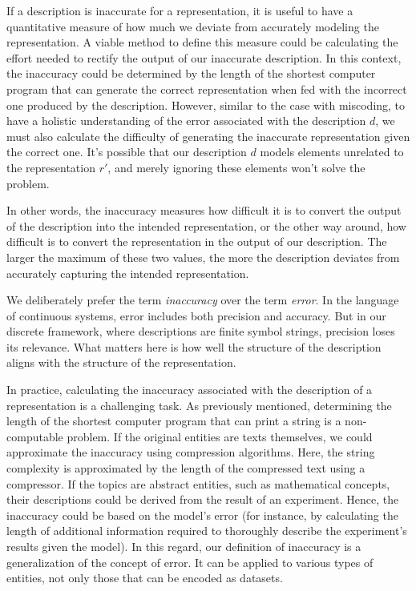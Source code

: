 If a description is inaccurate for a representation, it is useful to have a quantitative measure of how much we deviate from accurately modeling the representation. A viable method to define this measure could be calculating the effort needed to rectify the output of our inaccurate description. In this context, the inaccuracy could be determined by the length of the shortest computer program that can generate the correct representation when fed with the incorrect one produced by the description. However, similar to the case with miscoding, to have a holistic understanding of the error associated with the description $d$, we must also calculate the difficulty of generating the inaccurate representation given the correct one. It's possible that our description $d$ models elements unrelated to the representation $r'$, and merely ignoring these elements won't solve the problem.

In other words, the inaccuracy measures how difficult it is to convert the output of the description into the intended representation, or the other way around, how difficult is to convert the representation in the output of our description. The larger the maximum of these two values, the more the description deviates from accurately capturing the intended representation.

We deliberately prefer the term \emph{inaccuracy} over the term \emph{error}. In the language of continuous systems, error includes both precision and accuracy. But in our discrete framework, where descriptions are finite symbol strings, precision loses its relevance. What matters here is how well the structure of the description aligns with the structure of the representation.

In practice, calculating the inaccuracy associated with the description of a representation is a challenging task. As previously mentioned, determining the length of the shortest computer program that can print a string is a non-computable problem. If the original entities are texts themselves, we could approximate the inaccuracy using compression algorithms. Here, the string complexity is approximated by the length of the compressed text using a compressor. If the topics are abstract entities, such as mathematical concepts, their descriptions could be derived from the result of an experiment. Hence, the inaccuracy could be based on the model's error (for instance, by calculating the length of additional information required to thoroughly describe the experiment's results given the model). In this regard, our definition of inaccuracy is a generalization of the concept of error. It can be applied to various types of entities, not only those that can be encoded as datasets.

